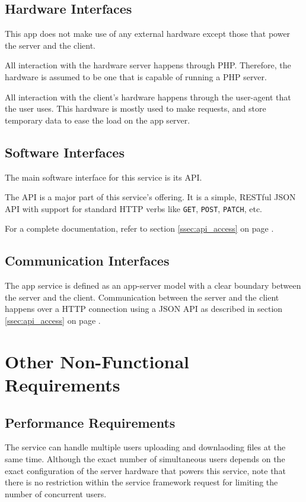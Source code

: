 \documentclass[12pt,a4paper]{report}
\begin{document}
\subsection{Hardware Interfaces}
This app does not make use of any external hardware except those that power the server and the client.

All interaction with the hardware server happens through PHP.
Therefore, the hardware is assumed to be one that is capable of running a PHP server.

All interaction with the client's hardware happens through the user-agent that the user uses.
This hardware is mostly used to make requests, and store temporary data to ease the load on the app server.
\subsection{Software Interfaces}
The main software interface for this service is its API.

The API is a major part of this service's offering.
It is a simple, RESTful JSON API with support for standard HTTP verbs like \texttt{GET}, \texttt{POST}, \texttt{PATCH}, etc.

For a complete documentation, refer to section \ref{ssec:api_access} on page \pageref{ssec:api_access}.
\subsection{Communication Interfaces}
The app service is defined as an app-server model with a clear boundary between the server and the client.
Communication between the server and the client happens over a HTTP connection using a JSON API as described in section \ref{ssec:api_access} on page \pageref{ssec:api_access}.

\section{Other Non-Functional Requirements}\label{sec:other_non_functional_requirements}

\subsection{Performance Requirements}
The service can handle multiple users uploading and downlaoding files at the same time.
Although the exact number of simultaneous users depends on the exact configuration of the server hardware that powers this service, note that there is no restriction within the service framework request for limiting the number of concurrent users.
\end{document}
